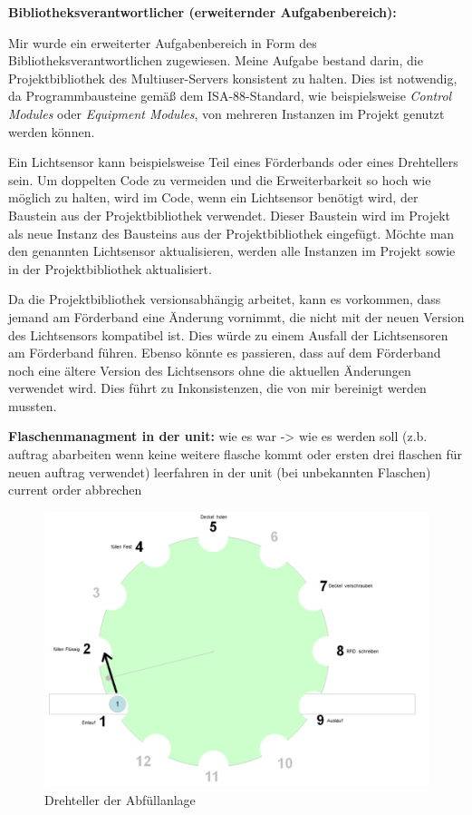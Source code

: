 \textbf{Bibliotheksverantwortlicher (erweiternder Aufgabenbereich):} 

Mir wurde ein erweiterter Aufgabenbereich in Form des Bibliotheksverantwortlichen zugewiesen. Meine Aufgabe bestand darin, 
die Projektbibliothek des Multiuser-Servers konsistent zu halten. Dies ist notwendig, da Programmbausteine gemäß dem 
ISA-88-Standard, wie beispielsweise \textit{Control Modules} oder \textit{Equipment Modules}, von mehreren Instanzen im 
Projekt genutzt werden können.

Ein Lichtsensor kann beispielsweise Teil eines Förderbands oder eines Drehtellers sein. Um doppelten Code zu vermeiden und 
die Erweiterbarkeit so hoch wie möglich zu halten, wird im Code, wenn ein Lichtsensor benötigt wird, der Baustein aus der 
Projektbibliothek verwendet. Dieser Baustein wird im Projekt als neue Instanz des Bausteins aus der Projektbibliothek 
eingefügt. Möchte man den genannten Lichtsensor aktualisieren, werden alle Instanzen im Projekt sowie in der 
Projektbibliothek aktualisiert.

Da die Projektbibliothek versionsabhängig arbeitet, kann es vorkommen, dass jemand am Förderband eine Änderung vornimmt, die 
nicht mit der neuen Version des Lichtsensors kompatibel ist. Dies würde zu einem Ausfall der Lichtsensoren am Förderband 
führen. Ebenso könnte es passieren, dass auf dem Förderband noch eine ältere Version des Lichtsensors ohne die aktuellen 
Änderungen verwendet wird. Dies führt zu Inkonsistenzen, die von mir bereinigt werden mussten.

\textbf{Flaschenmanagment in der unit:} 
wie es war -> wie es werden soll (z.b. auftrag abarbeiten wenn keine weitere flasche kommt oder ersten drei flaschen für neuen auftrag verwendet)
leerfahren in der unit (bei unbekannten Flaschen)
current order abbrechen 

\begin{figure}[h!]
    \centering
    \includegraphics{figures/image.png}
    \caption{Drehteller der Abfüllanlage\cite{bee2022}} %
    \label{Drehteller} %
\end{figure}

